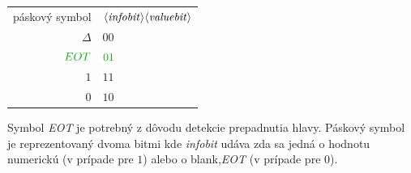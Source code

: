 \documentclass[11pt,a4paper]{article}
\newcommand{\green}[1]{\textcolor{OliveGreen}{#1}}
\begin{document}
\begin{center}
    \begin{tabular}{r@{ $\rightarrow$ }l}
        páskový symbol & $\langle \text{\textit{infobit}} \rangle \langle \text{\textit{valuebit}} \rangle$\\
        $\Delta$ & $00$\\
        $\green{EOT}$ & $\green{01}$\\
        $1$ & $11$\\
        $0$ & $10$\\
    \end{tabular}
\end{center}

Symbol \textit{EOT} je potrebný z dôvodu detekcie prepadnutia hlavy. Páskový symbol je reprezentovaný dvoma bitmi kde \textit{infobit} udáva zda sa jedná o hodnotu numerickú (v prípade pre $1$) alebo o blank,\textit{EOT} (v prípade pre $0$).
\end{document}
